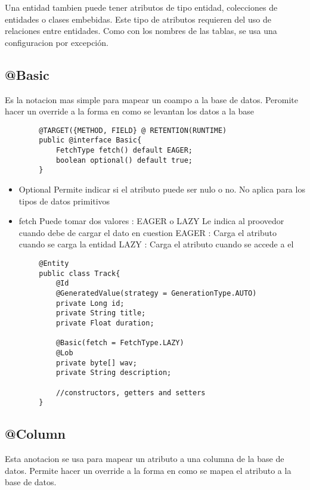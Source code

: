 \documentclass{article}
\begin{document}
Una entidad tambien puede tener atributos de tipo entidad, colecciones de entidades o clases embebidas. Este tipo de atributos requieren del uso de relaciones entre entidades.
Como con los nombres de las tablas, se usa una configuracion por excepción.

\subsection*{@Basic}

Es la notacion mas simple para mapear un coampo a la base de datos. Peromite hacer un override a la forma en como se levantan los datos a la base
\begin{lstlisting}
        @TARGET({METHOD, FIELD} @ RETENTION(RUNTIME)
        public @interface Basic{
            FetchType fetch() default EAGER;
            boolean optional() default true;
        }
    \end{lstlisting}

\begin{itemize}
	\item Optional
	      \subitem Permite indicar si el atributo puede ser nulo o no.
	      \subitem No aplica para los tipos de datos primitivos
	\item fetch
	      \subitem Puede tomar dos valores : EAGER o LAZY
	      \subitem Le indica al proovedor cuando debe de cargar el dato en cuestion
	      \subitem EAGER : Carga el atributo cuando se carga la entidad
	      \subitem LAZY : Carga el atributo cuando se accede a el
\end{itemize}

\begin{lstlisting}
        @Entity
        public class Track{
            @Id
            @GeneratedValue(strategy = GenerationType.AUTO)
            private Long id; 
            private String title;
            private Float duration;

            @Basic(fetch = FetchType.LAZY)
            @Lob
            private byte[] wav;
            private String description;

            //constructors, getters and setters
        }
    \end{lstlisting}

\subsection*{@Column}

Esta anotacion se usa para mapear un atributo a una columna de la base de datos. Permite hacer un override a la forma en como se mapea el atributo a la base de datos.
\end{document}
